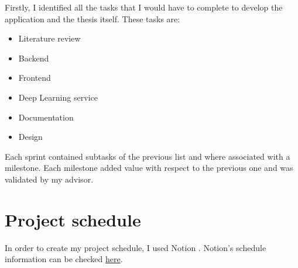 Firstly, I identified all the tasks that I would have to complete to develop the application and the thesis itself. These tasks are:
\begin{itemize}[noitemsep]
    \item Literature review
    \item Backend
    \item Frontend
    \item Deep Learning service
    \item Documentation
    \item Design
\end{itemize}

Each sprint contained subtasks of the previous list and where associated with a milestone.
Each milestone added value with respect to the previous one and was validated by my advisor.

\section{Project schedule}

In order to create my project schedule, I used Notion \cite{Notion}. Notion's schedule information can be checked \href{https://cyclic-chiller-238.notion.site/LearnASL-60bb8f91ed8f4ccfa90f98ee2306403d}{here}. \\

